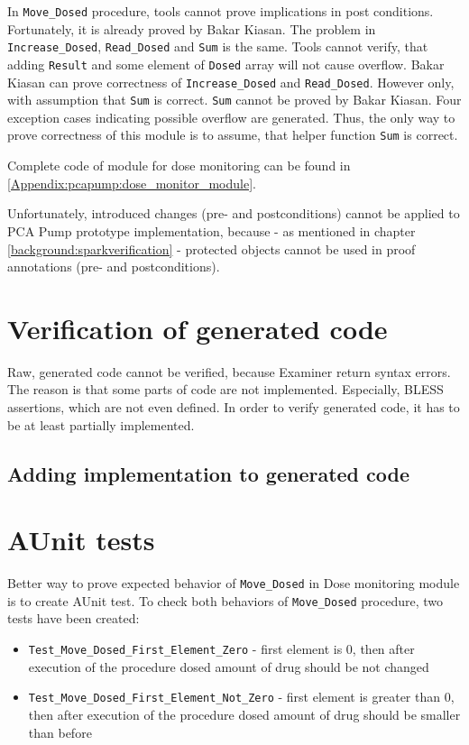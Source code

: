 In \lstinline{Move_Dosed} procedure, tools cannot prove implications in post conditions. Fortunately, it is already proved by Bakar Kiasan. The problem in \lstinline{Increase_Dosed}, \lstinline{Read_Dosed} and \lstinline{Sum} is the same. Tools cannot verify, that adding \lstinline{Result} and some element of \lstinline{Dosed} array will not cause overflow. Bakar Kiasan can prove correctness of \lstinline{Increase_Dosed} and \lstinline{Read_Dosed}. However only, with assumption that \lstinline{Sum} is correct. \lstinline{Sum} cannot be proved by Bakar Kiasan. Four exception cases indicating possible overflow are generated. Thus, the only way to prove correctness of this module is to assume, that helper function \lstinline{Sum} is correct.

Complete code of module for dose monitoring can be found in \ref{Appendix:pcapump:dose_monitor_module}.

Unfortunately, introduced changes (pre- and postconditions) cannot be applied to PCA Pump prototype implementation, because - as mentioned in chapter \ref{background:sparkverification} - protected objects cannot be used in proof annotations (pre- and postconditions).


\section{Verification of generated code}
\label{verification:generated}

Raw, generated code cannot be verified, because Examiner return syntax errors. The reason is that some parts of code are not implemented. Especially, BLESS assertions, which are not even defined. In order to verify generated code, it has to be at least partially implemented.


\subsection{Adding implementation to generated code}
\label{verification:generated:implementation}



\section{AUnit tests}
\label{verification:aunit}

Better way to prove expected behavior of \lstinline{Move_Dosed} in Dose monitoring module is to create AUnit test. To check both behaviors of \lstinline{Move_Dosed} procedure, two tests have been created:
\begin{itemize}
    \item \lstinline{Test_Move_Dosed_First_Element_Zero} - first element is 0, then after execution of the procedure dosed amount of drug should be not changed
    \item \lstinline{Test_Move_Dosed_First_Element_Not_Zero} - first element is greater than 0, then after execution of the procedure dosed amount of drug should be smaller than before
\end{itemize}

